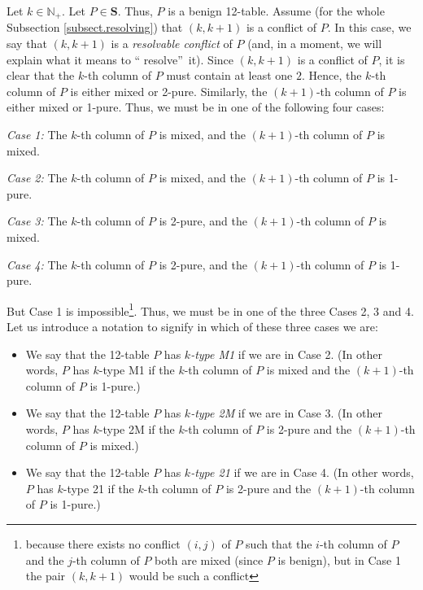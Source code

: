 \documentclass[numbers=enddot,12pt,final,onecolumn,notitlepage]{scrartcl}%
\theoremstyle{definition}
\newenvironment{verlong}{}{}
\begin{document}
\begin{verlong}
Let $k\in\mathbb{N}_{+}$. Let $P\in\mathbf{S}$. Thus, $P$ is a benign
12-table. Assume (for the whole Subsection \ref{subsect.resolving}) that
$\left(  k,k+1\right)  $ is a conflict of $P$. In this case, we say that
$\left(  k,k+1\right)  $ is a \textit{resolvable conflict} of $P$ (and, in a
moment, we will explain what it means to \textquotedblleft
resolve\textquotedblright\ it). Since $\left(  k,k+1\right)  $ is a conflict
of $P$, it is clear that the $k$-th column of $P$ must contain at least one
$2$. Hence, the $k$-th column of $P$ is either mixed or 2-pure. Similarly, the
$\left(  k+1\right)  $-th column of $P$ is either mixed or 1-pure. Thus, we
must be in one of the following four cases:

\textit{Case 1:} The $k$-th column of $P$ is mixed, and the $\left(
k+1\right)  $-th column of $P$ is mixed.

\textit{Case 2:} The $k$-th column of $P$ is mixed, and the $\left(
k+1\right)  $-th column of $P$ is 1-pure.

\textit{Case 3:} The $k$-th column of $P$ is 2-pure, and the $\left(
k+1\right)  $-th column of $P$ is mixed.

\textit{Case 4:} The $k$-th column of $P$ is 2-pure, and the $\left(
k+1\right)  $-th column of $P$ is 1-pure.

But Case 1 is impossible\footnote{because there exists no conflict $\left(
i,j\right)  $ of $P$ such that the $i$-th column of $P$ and the $j$-th column
of $P$ both are mixed (since $P$ is benign), but in Case 1 the pair $\left(
k,k+1\right)  $ would be such a conflict}. Thus, we must be in one of the
three Cases 2, 3 and 4. Let us introduce a notation to signify in which of
these three cases we are:

\begin{itemize}
\item We say that the 12-table $P$ has $k$\textit{-type M1} if we are in Case
2. (In other words, $P$ has $k$-type M1 if the $k$-th column of $P$ is mixed
and the $\left(  k+1\right)  $-th column of $P$ is 1-pure.)

\item We say that the 12-table $P$ has $k$\textit{-type 2M} if we are in Case
3. (In other words, $P$ has $k$-type 2M if the $k$-th column of $P$ is 2-pure
and the $\left(  k+1\right)  $-th column of $P$ is mixed.)

\item We say that the 12-table $P$ has $k$\textit{-type 21} if we are in Case
4. (In other words, $P$ has $k$-type 21 if the $k$-th column of $P$ is 2-pure
and the $\left(  k+1\right)  $-th column of $P$ is 1-pure.)
\end{itemize}


\end{verlong}
\end{document}
